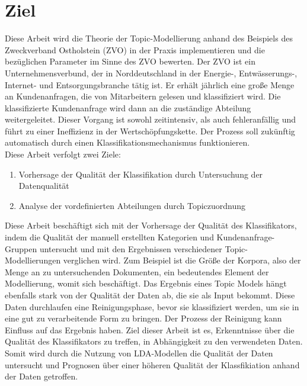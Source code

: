 \documentclass[german,version-2020-11]{uzl-thesis}
\begin{document}
\section{Ziel}
Diese Arbeit wird die Theorie der Topic-Modellierung anhand des Beispiels des Zweckverband Ostholstein (ZVO) in der Praxis implementieren und die bezüglichen Parameter im Sinne des ZVO bewerten. Der ZVO ist ein Unternehmensverbund, der in Norddeutschland in der Energie-, Entwässerungs-, Internet- und Entsorgungsbranche tätig ist.  Er erhält jährlich eine große Menge an Kundenanfragen, die von Mitarbeitern gelesen und klassifiziert wird. Die klassifizierte Kundenanfrage wird dann an die zuständige Abteilung weitergeleitet. Dieser Vorgang ist sowohl zeitintensiv, als auch fehleranfällig und führt zu einer Ineffizienz in der Wertschöpfungskette. Der Prozess soll zukünftig automatisch durch einen Klassifikationsmechanismus funktionieren. \\
Diese Arbeit verfolgt zwei Ziele: 
\begin{enumerate}
\item Vorhersage der Qualität der Klassifikation durch Untersuchung der Datenqualität
\item Analyse der vordefinierten Abteilungen durch Topiczuordnung
\end{enumerate}

Diese Arbeit beschäftigt sich mit der Vorhersage der Qualität des Klassifikators, indem die Qualität der manuell erstellten Kategorien und Kundenanfrage-Gruppen untersucht und mit den Ergebnissen verschiedener Topic-Modellierungen verglichen wird. Zum Beispiel ist die Größe der Korpora, also der Menge an zu untersuchenden Dokumenten, ein bedeutendes Element der Modellierung, womit sich \cite{rehurek_lrec} beschäftigt. Das Ergebnis eines Topic Models hängt ebenfalls stark von der Qualität der Daten ab, die sie als Input bekommt. Diese Daten durchlaufen eine Reinigungsphase, bevor sie klassifiziert werden, um sie in eine gut zu verarbeitende Form zu bringen. Der Prozess der Reinigung kann Einfluss auf das Ergebnis haben. Ziel dieser Arbeit ist es, Erkenntnisse über die Qualität des Klassifikators zu treffen, in Abhängigkeit zu den verwendeten Daten. Somit wird durch die Nutzung von LDA-Modellen die Qualität der Daten untersucht und Prognosen über einer höheren Qualität der Klassfikiation anhand der Daten getroffen. 
\end{document}
